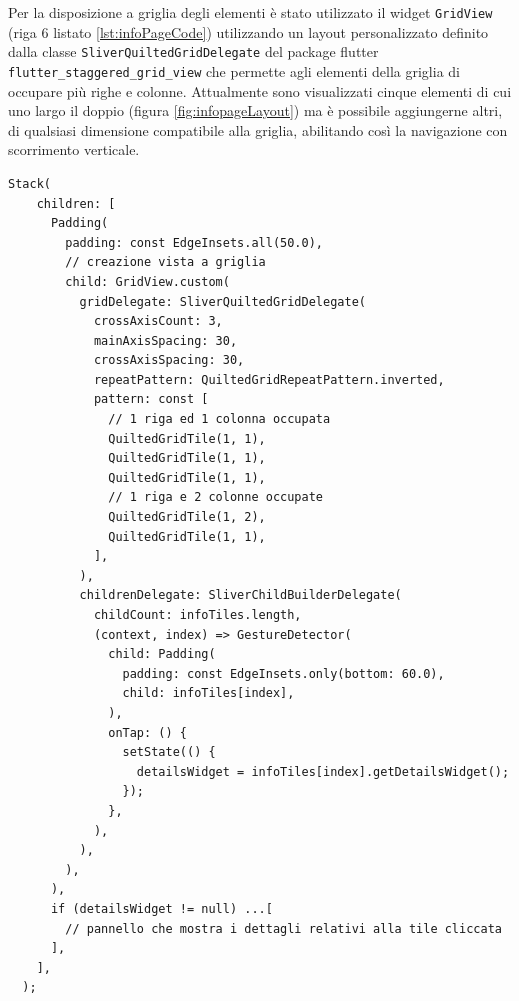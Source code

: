 Per la disposizione a griglia degli elementi è stato utilizzato il widget \texttt{GridView} (riga 6 listato \ref{lst:infoPageCode}) utilizzando un layout personalizzato definito dalla classe \texttt{SliverQuiltedGridDelegate} del package flutter \texttt{flutter\_staggered\_grid\_view} \cite{staggeredGridView} che permette agli elementi della griglia di occupare più righe e colonne.
Attualmente sono visualizzati cinque elementi di cui uno largo il doppio (figura \ref{fig:infopageLayout}) ma è possibile aggiungerne altri, di qualsiasi dimensione compatibile alla griglia, abilitando così la navigazione con scorrimento verticale.
\vspace{\baselineskip}
\begin{lstlisting}[style=FlutterStyle, caption={Porzione di codice all'interno di \texttt{\_InfoPageState} per la creazione della pagina delle informazioni.}, label={lst:infoPageCode}]
  Stack(
    children: [
      Padding(
        padding: const EdgeInsets.all(50.0),
        // creazione vista a griglia
        child: GridView.custom(
          gridDelegate: SliverQuiltedGridDelegate(
            crossAxisCount: 3,
            mainAxisSpacing: 30,
            crossAxisSpacing: 30,
            repeatPattern: QuiltedGridRepeatPattern.inverted,
            pattern: const [
              // 1 riga ed 1 colonna occupata
              QuiltedGridTile(1, 1),  
              QuiltedGridTile(1, 1),
              QuiltedGridTile(1, 1),
              // 1 riga e 2 colonne occupate
              QuiltedGridTile(1, 2),
              QuiltedGridTile(1, 1),
            ],
          ),
          childrenDelegate: SliverChildBuilderDelegate(
            childCount: infoTiles.length,
            (context, index) => GestureDetector(
              child: Padding(
                padding: const EdgeInsets.only(bottom: 60.0),
                child: infoTiles[index],
              ),
              onTap: () {
                setState(() {
                  detailsWidget = infoTiles[index].getDetailsWidget();
                });
              },
            ),
          ),
        ),
      ),
      if (detailsWidget != null) ...[
        // pannello che mostra i dettagli relativi alla tile cliccata
      ],
    ],
  );
\end{lstlisting}
%
